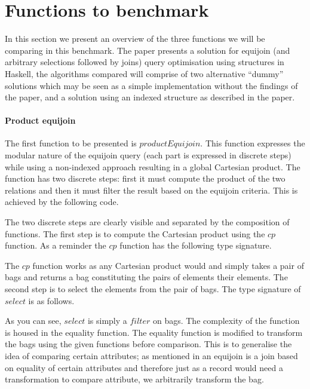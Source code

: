 \section{Functions to benchmark}
In this section we present an overview of the three functions we will
be comparing in this benchmark. The paper \relalg{} presents a solution for
equijoin (and arbitrary selections followed by joins) query optimisation using
structures in Haskell, the algorithms compared will comprise of two alternative
``dummy'' solutions which may be seen as a simple implementation without the
findings of the paper, and a solution using an indexed structure as described
in the paper.

\paragraph{Product equijoin} The first function to be presented is
$productEquijoin$. This function
expresses the modular nature of the equijoin query (each part is expressed in
discrete steps) while using a non-indexed approach resulting in a global
Cartesian product.
The function has two discrete steps: first it must compute the product of the
two relations and then it must filter the result based on the equijoin criteria.
This is achieved by the following code.



\noindent
The two discrete steps are clearly visible and separated by the composition of
functions. The first step is to compute the Cartesian product using the
$cp$ function. As a reminder the $cp$ function has
the following type signature.


\noindent
The $cp$ function works as any Cartesian product would and simply takes a pair of bags and
returns a bag constituting the pairs of elements their elements.
The second step is to select the elements from the pair of
bags. The type signature of $select$ is as follows.


\noindent
As you can see, $select$ is simply a
$filter$ on bags. The complexity of the function is housed in the
equality function. The equality function is modified to transform the bags using
the given functions before comparison. This is to generalise the idea of
comparing certain attributes; as mentioned in  an
equijoin is a join based on equality of certain attributes and therefore just as
a record would need a transformation to compare attribute, we arbitrarily
transform the bag.

